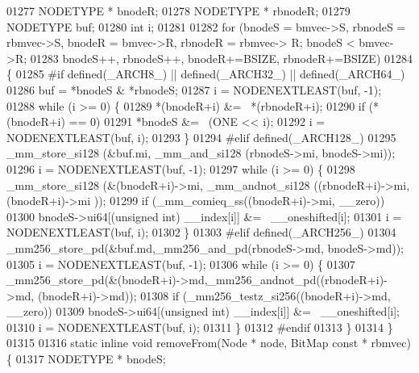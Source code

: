 \begin{DoxyCode}
{01277         NODETYPE * bnodeR;
01278         NODETYPE * rbnodeR;
01279         NODETYPE buf;
01280         \textcolor{keywordtype}{int} i;
01281 
01282         \textcolor{keywordflow}{for} (bnodeS = bmvec->S, rbnodeS = rbmvec->S, bnodeR = bmvec->R, rbnodeR = rbmvec->
      R; bnodeS < bmvec->R;
01283                         bnodeS++, rbnodeS++, bnodeR+=BSIZE, rbnodeR+=BSIZE)
01284         \{
01285 \textcolor{preprocessor}{#if defined(\_ARCH8\_) || defined(\_ARCH32\_) || defined(\_ARCH64\_)}
01286                 buf = *bnodeS & *rbnodeS;
01287                 i = NODENEXTLEAST(buf, -1);
01288                 \textcolor{keywordflow}{while} (i >= 0) \{
01289                         *(bnodeR+i) &= ~*(rbnodeR+i);
01290                         \textcolor{keywordflow}{if} (*(bnodeR+i) == 0)
01291                                 *bnodeS &= ~(ONE << i);
01292                         i = NODENEXTLEAST(buf, i);
01293                 \}
01294 \textcolor{preprocessor}{#elif defined(\_ARCH128\_)}
01295                 \_mm\_store\_si128 (&buf.mi, \_mm\_and\_si128 (rbnodeS->mi, bnodeS->mi));
01296                 i = NODENEXTLEAST(buf, -1);
01297                 \textcolor{keywordflow}{while} (i >= 0) \{
01298                         \_mm\_store\_si128 (&(bnodeR+i)->mi, \_mm\_andnot\_si128 ((rbnodeR+i)->mi, (bnodeR+i)->mi
      ));
01299                         \textcolor{keywordflow}{if} (\_mm\_comieq\_ss((bnodeR+i)->mi, \_\_zero))
01300                                 bnodeS->ui64[(\textcolor{keywordtype}{unsigned} int) \_\_index[i]] &= ~\_\_oneshifted[i];
01301                         i = NODENEXTLEAST(buf, i);
01302                 \}
01303 \textcolor{preprocessor}{#elif defined(\_ARCH256\_)}
01304                 \_mm256\_store\_pd(&buf.md,\_mm256\_and\_pd(rbnodeS->md, bnodeS->md));
01305                 i = NODENEXTLEAST(buf, -1);
01306                 \textcolor{keywordflow}{while} (i >= 0) \{
01307                         \_mm256\_store\_pd(&(bnodeR+i)->md,\_mm256\_andnot\_pd((rbnodeR+i)->md, (bnodeR+i)->md));
01308                         \textcolor{keywordflow}{if} (\_mm256\_testz\_si256((bnodeR+i)->md, \_\_zero))
01309                                 bnodeS->ui64[(\textcolor{keywordtype}{unsigned} int) \_\_index[i]] &= ~\_\_oneshifted[i];
01310                         i = NODENEXTLEAST(buf, i);
01311                 \}
01312 \textcolor{preprocessor}{#endif}
01313         \}
01314 \}
01315 
01316 \textcolor{keyword}{static} \textcolor{keyword}{inline} \textcolor{keywordtype}{void} removeFrom(Node * node, BitMap \textcolor{keyword}{const} * rbmvec) \{
01317         NODETYPE * bnodeS;
}
\end{DoxyCode}
